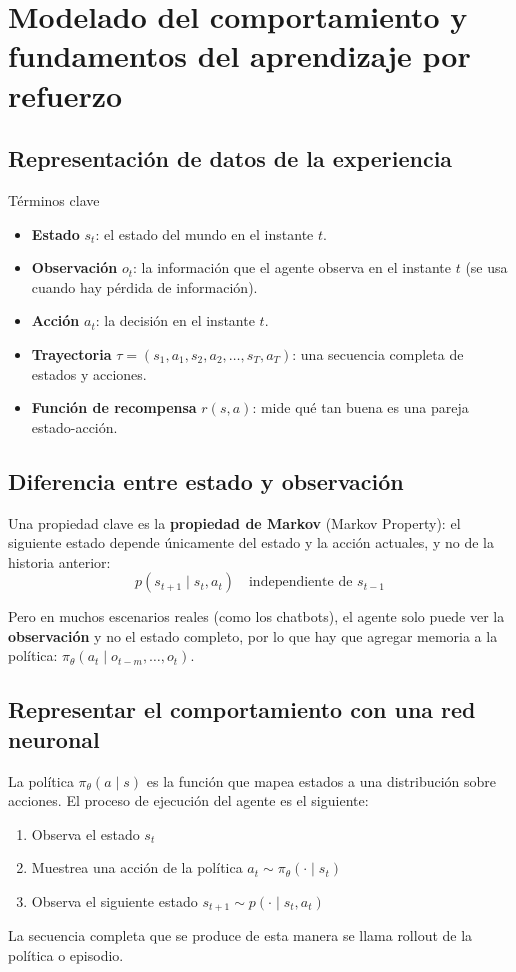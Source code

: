 \section{Modelado del comportamiento y fundamentos del aprendizaje por refuerzo}

\subsection{Representación de datos de la experiencia}

\begin{importantbox}{Términos clave}
\begin{itemize}
    \item \textbf{Estado} $s_t$: el estado del mundo en el instante $t$.
    \item \textbf{Observación} $o_t$: la información que el agente observa en el instante $t$ (se usa cuando hay pérdida de información).
    \item \textbf{Acción} $a_t$: la decisión en el instante $t$.
    \item \textbf{Trayectoria} $\tau = (s_1, a_1, s_2, a_2, \ldots, s_T, a_T)$: una secuencia completa de estados y acciones.
    \item \textbf{Función de recompensa} $r(s, a)$: mide qué tan buena es una pareja estado-acción.
\end{itemize}
\end{importantbox}

\subsection{Diferencia entre estado y observación}

Una propiedad clave es la \textbf{propiedad de Markov} (Markov Property): el siguiente estado depende únicamente del estado y la acción actuales, y no de la historia anterior:
$$p(s_{t+1} \mid s_t, a_t) \quad \text{independiente de } s_{t-1}$$

Pero en muchos escenarios reales (como los chatbots), el agente solo puede ver la \textbf{observación} y no el estado completo, por lo que hay que agregar memoria a la política: $\pi_\theta(a_t \mid o_{t-m}, \ldots, o_t)$.

\subsection{Representar el comportamiento con una red neuronal}

La política $\pi_\theta(a \mid s)$ es la función que mapea estados a una distribución sobre acciones. El proceso de ejecución del agente es el siguiente:
\begin{enumerate}
    \item Observa el estado $s_t$
    \item Muestrea una acción de la política $a_t \sim \pi_\theta(\cdot \mid s_t)$
    \item Observa el siguiente estado $s_{t+1} \sim p(\cdot \mid s_t, a_t)$
\end{enumerate}
La secuencia completa que se produce de esta manera se llama rollout de la política o episodio.

